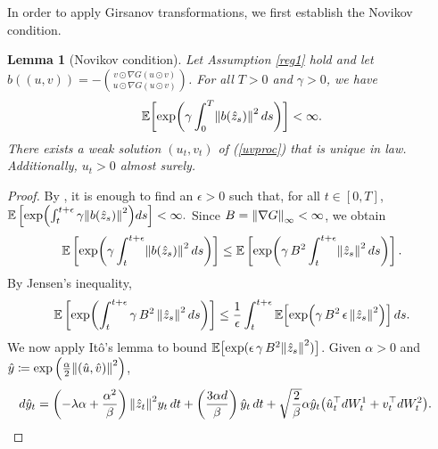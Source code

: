 \documentclass[11pt, twoside]{report}
\newtheorem{lemma}[theorem]{Lemma}
\begin{document}
 In order to apply  Girsanov transformations, we first establish the Novikov condition.
\begin{lemma}[Novikov condition]\label{lem:novikov}
    Let Assumption \ref{reg1} hold and let $b((u,v)) = -\binom{v\odot \nabla G(u\odot v)}{u\odot \nabla G(u\odot v)}$. For all $T>0$ and $\gamma>0$, we have
    $$
    \EE\biggl[ \exp\biggl(\gamma \int_0^T \norm{b(\hat{z}_s)}^2 \,ds\biggr) \biggr] <\infty.
    $$
    There exists a weak solution $(u_t,v_t)$ of (\ref{uvproc}) that is unique in law. Additionally, $u_t>0$ almost surely.
\end{lemma}
\begin{proof}

By \cite[Corollary 5.14]{Karatzas1991-xr}, it is enough to find an $\epsilon>0$ such that, for all $t\in [0,T]$, 
$
\EE\left[ \exp\pa{\int_t^{t+\epsilon}  \gamma \norm{b(\hat{z}_s)}^2} ds \right] <\infty.
$
Since $B = \left\lVert\nabla G\right\rVert_\infty<\infty$, we obtain
\begin{align*}
    \EE\left[ \exp\pa{\gamma \int_t^{t+\epsilon} \norm{b(\hat{z}_s)}^2 \,ds} \right] \leq  \EE\left[\exp\pa{ \gamma \,\cinfty^2\int_t^{t+\epsilon} \norm{\hat{z}_s}^2 \,ds }\right].
\end{align*}
By Jensen's inequality,
\begin{equation}\label{eq:novikov}
    \EE\left[\exp\pa{ \int_t^{t+\epsilon} \gamma\, \cinfty^2\, \norm{\hat{z}_s}^2 \,ds} \right] \leq  \frac{1}{\epsilon}  \int_t^{t+\epsilon} \EE\Bigl[ \exp\pa{\gamma\, \cinfty^2\, \epsilon\,  \norm{\hat{z}_s}^2 } \Bigr] \,ds.
\end{equation}
We now apply It\^o's lemma to bound $\EE \bigl[ \exp(\epsilon\, \gamma\, \cinfty^2 \norm{\hat{z}_s}^2 ) \bigr]$. 
Given  $\alpha>0$ and  $\hat{y} \eqdef\exp\left(\frac{\alpha}{2}\norm{(\hat{u},\hat{v})}^2 \right)$,
\begin{align*}
    d\hat y_t &= \pa{-\lambda \alpha  + \frac{\alpha^2}{\beta}} \,\norm{\hat z_t}^2y_t\, dt + \pa{\frac{3\alpha d}{\beta}}\, \hat y_t\, dt + \sqrt{\frac{2}{\beta}} \alpha \hat y_t  \pa{\hat u_t^\top d W^1_t + v_t^\top d W^2_t}.
\end{align*}

\end{proof}
\end{document}
